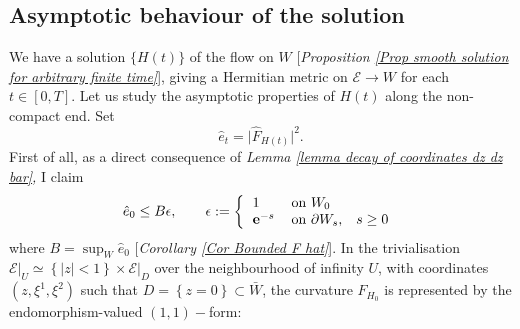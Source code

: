 \documentclass{article}
\newcommand{\e}[1]{\mathbf{e}^{#1}}
\begin{document}
\subsection{Asymptotic behaviour of the solution}
\label{subsec asymp behaviour of sol} 
We have a solution $\{ H\left( t\right) \} $ of the flow on $W$ [\emph{Proposition \ref{Prop smooth solution for arbitrary
finite time}}], giving a Hermitian metric on $\mathcal{E}\rightarrow W$ for
each $t\in \left[ 0,T\right] $. Let us study the asymptotic properties of $%
H\left( t\right) $ along the non-compact end. Set
\begin{equation*}
        \hat{e}_{t}=\vert \hat{F}_{H\left( t\right) }\vert ^{2}.
\end{equation*}%
First of all, as a direct consequence of \emph{Lemma \ref{lemma decay of
coordinates dz dz bar},} I claim%
\begin{equation}        \label{Eq (e hat)0 decays exp}
                        \index{asymptotic decay} 
\hat{e}_{0}\leq B\epsilon ,\qquad \epsilon := \left\{ 
\begin{tabular}{ll}
$1$ & on $W_{0}$ \\ 
$\e{-s}$ & on $\partial W_{s}$,$\quad s\geq 0$%
\end{tabular}%
\right.
\end{equation}%
where $B=\sup_{W}\hat{e}_{0}$ [\emph{Corollary \ref{Cor Bounded
F hat}}]. In the trivialisation $\left. \mathcal{E}\right\vert _{U}\simeq\left\{ \left\vert z\right\vert <1 \right\}\times \left. \mathcal{E}\right\vert _{D}$
 over the
neighbourhood of infinity $U$, with coordinates $\left( z,\xi ^{1},\xi ^{2}\right)$ such that
  $D=\left\{ z=0\right\} \subset \bar{W}$, the curvature $F_{H_{0}}$ is represented by the endomorphism-valued $\left(
1,1\right) -$form:%
\end{document}
